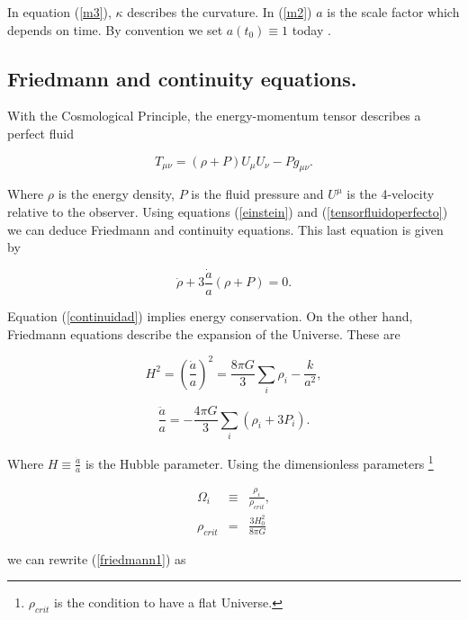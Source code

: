 \documentclass[onecolumn,           %
               showpacs,            %
               preprintnumbers,     %
               aps,                 %
               prl,          	    %
               letterpaper,             %
               superscriptaddress,      %
               nofootinbib,         %
               tightenlines,        %
               floats,floatfix      %
               ,usenatbib,
               ]{revtex4-1}
\begin{document}
In equation (\ref{m3}), $\kappa$ describes the curvature. In (\ref{m2}) $a$ is the scale factor which depends on time. By convention we set $a(t_0) \equiv 1$ today \cite{cambridge}.

\subsection{Friedmann and continuity equations.}
With the Cosmological Principle, the energy-momentum tensor describes a perfect fluid \cite{cambridge}

\begin{equation}
\label{tensorfluidoperfecto}
T_{\mu \nu} = (\rho + P)U_{\mu}U_{\nu} - Pg_{\mu \nu} .
\end{equation} 

Where $\rho$ is the energy density, $P$ is the fluid pressure and $U^{\mu}$ is the 4-velocity relative to the observer. Using equations (\ref{einstein}) and (\ref{tensorfluidoperfecto}) we can deduce Friedmann and continuity equations. This last equation is given by

\begin{equation}
\label{continuidad}
\dot{\rho} + 3 \frac{\dot{a}}{a} \left(\rho + P\right) = 0.
\end{equation}

Equation (\ref{continuidad}) implies energy conservation. On the other hand, Friedmann equations describe the expansion of the Universe. These are

\begin{equation}
\label{friedmann1}
H^2 = \left(\frac{\dot{a}}{a}\right)^2 = \frac{8 \pi G}{3} \sum_{i}\rho_{i} - \frac{k}{a^2} ,
\end{equation}

\begin{equation}
\frac{\ddot{a}}{a} = -\frac{4 \pi G}{3} \sum_{i}\left(\rho_i + 3P_i\right) .
\end{equation}

Where $H \equiv \frac{\dot{a}}{a}$ is the Hubble parameter. Using the dimensionless parameters \footnote{$\rho_{crit}$ is the condition to have a flat Universe.}

\begin{eqnarray}
\Omega_{i} &\equiv& \frac{\rho_i}{\rho_{crit}},\\
\rho_{crit} &=& \frac{3H_0^2}{8 \pi G}
\end{eqnarray} 

we can rewrite (\ref{friedmann1}) as
\end{document}
